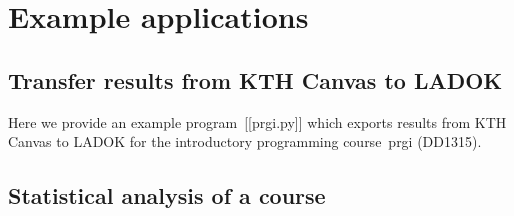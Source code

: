\documentclass[a4paper]{report}
\begin{document}



\part{Example applications}

\chapter{Transfer results from KTH Canvas to LADOK}

Here we provide an example program~[[prgi.py]] which exports results from KTH 
Canvas to LADOK for the introductory programming course~prgi (DD1315).




\chapter{Statistical analysis of a course}




\printbibliography
\end{document}
